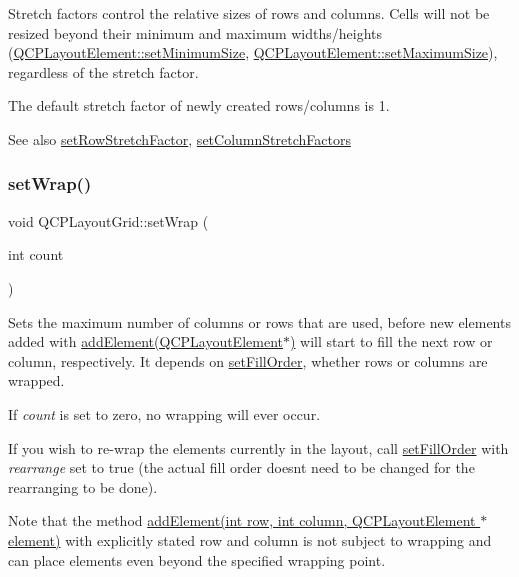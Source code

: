 Stretch factors control the relative sizes of rows and columns. Cells will not be resized beyond their minimum and maximum widths/heights (\hyperlink{class_q_c_p_layout_element_a5dd29a3c8bc88440c97c06b67be7886b}{Q\+C\+P\+Layout\+Element\+::set\+Minimum\+Size}, \hyperlink{class_q_c_p_layout_element_a74eb5280a737ab44833d506db65efd95}{Q\+C\+P\+Layout\+Element\+::set\+Maximum\+Size}), regardless of the stretch factor.

The default stretch factor of newly created rows/columns is 1.

\begin{DoxySeeAlso}{See also}
\hyperlink{class_q_c_p_layout_grid_a7b0273de5369bd93d942edbaf5b166ec}{set\+Row\+Stretch\+Factor}, \hyperlink{class_q_c_p_layout_grid_a6c2591d1a7e2534ce036989543b49e57}{set\+Column\+Stretch\+Factors} 
\end{DoxySeeAlso}
\mbox{\label{class_q_c_p_layout_grid_ab36af18d77e4428386d02970382ee598}} 
\subsubsection{\texorpdfstring{set\+Wrap()}{setWrap()}}
{\footnotesize\ttfamily void Q\+C\+P\+Layout\+Grid\+::set\+Wrap (\begin{DoxyParamCaption}\item[{int}]{count }\end{DoxyParamCaption})}

Sets the maximum number of columns or rows that are used, before new elements added with \hyperlink{class_q_c_p_layout_grid_a4c44025dd25acd27e053cadfd448ad7b}{add\+Element(\+Q\+C\+P\+Layout\+Element$\ast$)} will start to fill the next row or column, respectively. It depends on \hyperlink{class_q_c_p_layout_grid_affc2f3cfd22f28698c5b29b960d2a391}{set\+Fill\+Order}, whether rows or columns are wrapped.

If {\itshape count} is set to zero, no wrapping will ever occur.

If you wish to re-\/wrap the elements currently in the layout, call \hyperlink{class_q_c_p_layout_grid_affc2f3cfd22f28698c5b29b960d2a391}{set\+Fill\+Order} with {\itshape rearrange} set to true (the actual fill order doesn\textquotesingle{}t need to be changed for the rearranging to be done).

Note that the method \hyperlink{class_q_c_p_layout_grid_adff1a2ca691ed83d2d24a4cd1fe17012}{add\+Element(int row, int column, Q\+C\+P\+Layout\+Element $\ast$element)} with explicitly stated row and column is not subject to wrapping and can place elements even beyond the specified wrapping point.

